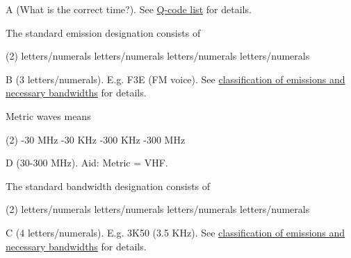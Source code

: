 \documentclass[a4paper]{article}
\begin{document}
\begin{solution}
	A (What is the correct time?). See \href{http://www.giangrandi.ch/electronics/radio/qcode.shtml}{Q-code list} for details.
\end{solution}

\vspace{5mm}



\begin{question}The standard emission designation consists of
	\begin{tasks}(2)
		 letters/numerals
		 letters/numerals
		 letters/numerals
		 letters/numerals
	\end{tasks}
\end{question}

\begin{solution}
	B (3 letters/numerals). E.g. F3E (FM voice). See \href{http://www.wpc.dot.gov.in/Static/emission_help.html}{classification of emissions and necessary bandwidths} for details.
\end{solution}

\vspace{5mm}



\begin{question}Metric waves means
	\begin{tasks}(2)
		-30 MHz
		-30 KHz
		-300 KHz
		-300 MHz
	\end{tasks}
\end{question}

\begin{solution}
	D (30-300 MHz). Aid: Metric = VHF.
\end{solution}

\vspace{5mm}



\begin{question}The standard bandwidth designation consists of
	\begin{tasks}(2)
		 letters/numerals
		 letters/numerals
		 letters/numerals
		 letters/numerals
	\end{tasks}
\end{question}

\begin{solution}
	C (4 letters/numerals). E.g. 3K50 (3.5 KHz). See \href{http://www.wpc.dot.gov.in/Static/emission_help.html}{classification of emissions and necessary bandwidths} for details.
\end{solution}
\end{document}
